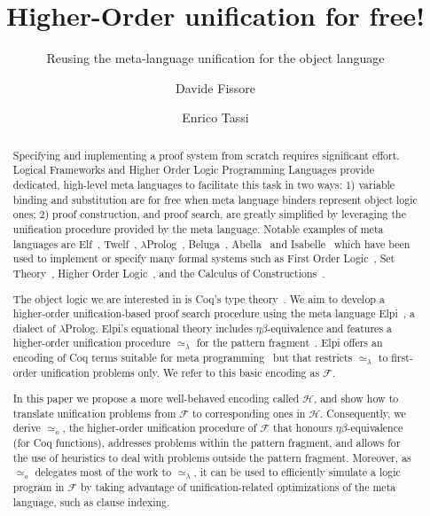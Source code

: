 \documentclass[sigconf,natbib=false,review]{acmart}
\newcommand{\UnifRel}{\ensuremath{\simeq}}
\newcommand{\Uo}{\texorpdfstring{\ensuremath{\UnifRel_o}\xspace}{unif\_o}}
\newcommand{\Ue}{\ensuremath{\UnifRel_\lambda}\xspace}
\newcommand{\Fo}{\texorpdfstring{\ensuremath{\mathcal{F}\xspace}}{F}} %
\newcommand{\Ho}{\texorpdfstring{\ensuremath{\mathcal{H}}\xspace}{H}}
\begin{document}
\title{Higher-Order unification for free!}
\subtitle{Reusing the meta-language unification for the object language}

\author{Davide Fissore}

\author{Enrico Tassi}

\begin{abstract}
  Specifying and implementing a proof system from scratch requires significant effort.
  Logical Frameworks and Higher Order Logic Programming Languages provide
  dedicated, high-level meta languages to facilitate this task in two
  ways: 1) variable binding and substitution are for free when meta language binders
  represent object logic ones; 2) proof construction, and %
  proof search, are
  greatly simplified by leveraging the unification procedure provided by the meta language.
  Notable examples of meta languages are Elf~\cite{elf}, Twelf~\cite{twelf},
  $\lambda$Prolog~\cite{miller_nadathur_2012}, Beluga~\cite{Beluga}, Abella~\cite{gacek2008abella} and
  Isabelle~\cite{10.1007/978-3-540-71067-7_7}
  which have been %
  used to implement or specify %
  many
  formal systems such as
  First Order Logic~\cite{felty88cade},
  Set Theory~\cite{10.1007/BF00881873},
  Higher Order Logic~\cite{books/sp/NipkowPW02}, and %
  the Calculus of
  Constructions~\cite{felty93lics}.

  The object logic we are interested in is
  Coq's type theory~\cite{Coq-refman}. We aim to
  develop a higher-order unification-based 
  proof search procedure %
  using the meta language
  Elpi~\cite{dunchev15lpar}, a dialect of $\lambda$Prolog.
  Elpi's equational theory includes
  $\eta\beta$-equivalence and features a
  higher-order unification procedure \Ue 
  for the
  pattern fragment~\cite{miller92jsc}.
  Elpi offers an encoding of Coq terms suitable
  for meta programming~\cite{tassi:hal-01637063,tassi:hal-01897468,gregoire:hal-03800154,newtc}
  but that restricts \Ue to first-order unification problems only.
  We refer to this basic encoding as \Fo.
  
  In this paper we propose a more well-behaved encoding called \Ho,
  and show how to translate unification problems from \Fo{}
  to corresponding ones in \Ho.
  Consequently, we derive \Uo{}, the higher-order unification procedure of \Fo{}
    that honours $\eta\beta$-equivalence (for Coq functions), addresses
  problems within the pattern fragment, and allows
  for the use of heuristics to deal with problems outside the
  pattern fragment. Moreover, as \Uo{} delegates most of the work to \Ue,
  it can be used to efficiently simulate a logic program in \Fo{} by
  taking advantage of
  unification-related optimizations of the meta language, such as clause indexing.

\end{abstract}
\end{document}
